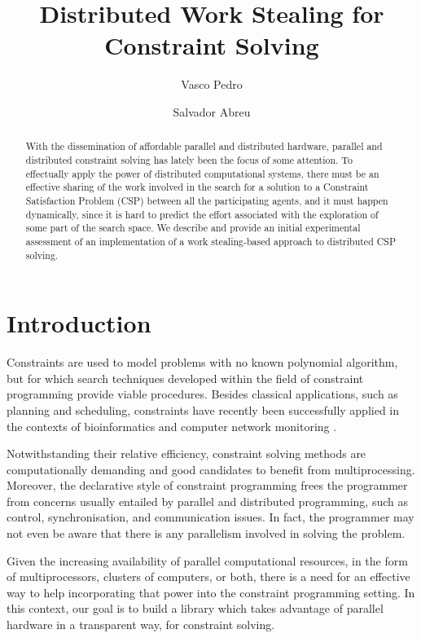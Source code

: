 \documentclass{llncs}
\title{Distributed Work Stealing for \\ Constraint Solving}
\author{Vasco Pedro \and Salvador Abreu}
\institute{Departamento de Inform\'atica,
  Universidade de \'Evora and
  \2pt]
  \email{\{vp,spa\}@di.uevora.pt}}
\begin{document}
\maketitle

\begin{abstract}
  With the dissemination of affordable parallel and distributed
  hardware, parallel and distributed constraint solving has lately
  been the focus of some attention. To effectually apply the power of
  distributed computational systems, there must be an effective
  sharing of the work involved in the search for a solution to a
  Constraint Satisfaction Problem (CSP) between all the participating
  agents, and it must happen dynamically, since it is hard to predict
  the effort associated with the exploration of some part of the
  search space. We describe and provide an initial experimental
  assessment of an implementation of a work stealing-based approach to
  distributed CSP solving.
\end{abstract}


\section{Introduction}

Constraints are used to model problems with no known polynomial
algorithm, but for which search techniques developed within the field
of constraint programming provide viable procedures. Besides classical
applications, such as planning and scheduling, constraints have
recently been successfully applied in the contexts of bioinformatics
\cite{HCP:bioinf} and computer network monitoring \cite{pds@inap2009}.

Notwithstanding their relative efficiency, constraint solving methods
are computationally demanding and good candidates to benefit from
multiprocessing. Moreover, the declarative style of constraint
programming frees the programmer from concerns usually entailed by
parallel and distributed programming, such as control,
synchronisation, and communication issues. In fact, the programmer may
not even be aware that there is any parallelism involved in solving
the problem.

Given the increasing availability of parallel computational resources,
in the form of multiprocessors, clusters of computers, or both, there
is a need for an effective way to help incorporating that power into
the constraint programming setting. In this context, our goal is to
build a library which takes advantage of parallel hardware in a
transparent way, for constraint solving.
\end{document}
